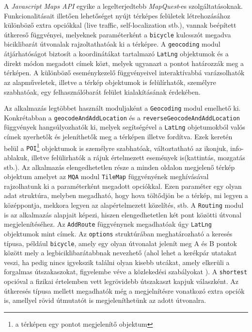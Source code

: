 \par A \textit{Javascript Maps API} egyike a legelterjedtebb \textit{MapQuest}-es szolgáltatásoknak. Funkcionalitásait illetően lehetőséget nyújt térképes felületek létrehozásához különböző extra opciókkal (live traffic, self-localization stb.), vannak beépített útkereső függvényei, melyeknek paraméterként a {\tt bicycle} kulcsszót megadva biciklibarát útvonalak rajzoltathatóak ki a térképre. A {\tt geocoding} modul átjárhatóságot biztosít a koordinátákat tartalmazó {\tt LatLng} objektumok és a direkt módon megadott címek közt, melyek ugyanazt a pontot határozzák meg a térképen. A különböző eseménykezelő függvényeivel interaktívabbá varázsolhatók az alapműveletek, illetve a térkép objektumok is felülírhatók, személyre szabhatóak, egy felhasználóbarát felület kialakításának érdekében.  
\par 
Az alkalmazás legtöbbet használt moduljaként a {\tt Geocoding} modul emelhető ki. Konkrétabban a {\tt geocodeAndAddLocation} és a {\tt reverseGeocodeAndAddLocation} függvények hangsúlyozhatók ki, melyek segítségével a {\tt LatLng} objetumokból valós címek nyerhetők és jeleníthetők meg a térképen illetve fordítva. Ezek keretén belül a {\tt POI}\footnote{a térképen egy pontot megjelenítő objektum} objektumok is személyre szabhatóak, változtatható az ikonjuk, info-ablakuk, illetve felülirhatók a rájuk értelmezett események is(kattintás, mozgatás stb.). Az alkalmazás elengedhetetlen része a minden oldalon megjelenő térkép objektum amelyet az {\tt MQA} modul {\tt TileMap} függvényének meghívásával rajzolhatunk ki a paraméterként megadott opciókkal. Ezen paraméter egy olyan adat struktúra, melyben megadható, hogy hova töltődjön be a térkép, mi legyen a középpontja, mekkora legyen az alapértelmezett közelítés, stb. A  {\tt Routing} modul is az alkalmazás alapjait képezi, hiszen elengedhetetlen két pont közötti útvonal megjelenítéséhez. Az  {\tt AddRoute} függvénynek megadhatóak úgy  {\tt LatLng} objektumok mint címek. Az  {\tt options} struktúrában meghatározható a keresés típusa, például  {\tt bicycle}, amely egy olyan útvonalat jelenít meg A és B pontok között mely a legbiciklibarátabbnak nevezhető (ahol lehet a kerékpár utatakat veszi,  ha pedig nincs igyekszik találni olyan  kisebb utcákat, amely elkerüli a forgalmas útszakaszokat, figyelembe véve a közlekedési szabályokat ). A  {\tt shortest} opcióval a fizikai értelemben vett legrövidebb útszakaszt kapjuk válaszként. Az útkeresés típusa mellett megadhatók még a megjelnítésre vonatkozó extra opciók is, amellyel rövid útmutatót is megjeleníthetünk az adott útvonalra.

